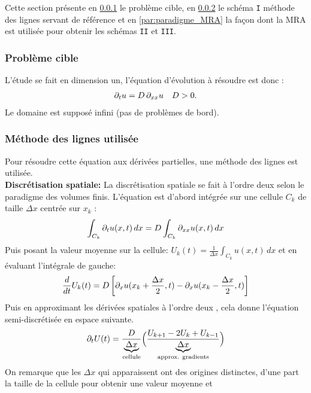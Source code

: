 Cette section présente en \ref{par:contrib2_target} le problème cible, en \ref{par:contrib2_MoL} le schéma \texttt{I} méthode des lignes servant de référence et en \ref{par:paradigme_MRA} la façon dont la MRA est utilisée pour obtenir les schémas \texttt{II} et \texttt{III}.
\subsubsection{Problème cible}\label{par:contrib2_target}

    L'étude se fait en dimension un, l'équation d'évolution à résoudre est donc :
    \begin{align}
        \partial_t u = D \,\partial_{xx} u \quad D >0.
    \end{align}
    Le domaine est supposé infini (pas de problèmes de bord).
        \subsubsection{Méthode des lignes utilisée}\label{par:contrib2_MoL}
            Pour résoudre cette équation aux dérivées partielles, une méthode des lignes est utilisée.\\
            \textbf{Discrétisation spatiale: }
            La discrétisation spatiale se fait à l'ordre deux selon le paradigme des volumes finis.
            L'équation est d'abord intégrée sur une cellule $C_k$ de taille $\Delta x$ centrée sur $x_k$ : 
            \begin{align}
                \int_{C_k} \partial_t u(x,t) \, dx = D \int_{C_k} \partial_{xx} u(x,t) \, dx 
            \end{align}
            Puis posant la valeur moyenne sur la cellule: $U_k(t) = \frac{1}{\Delta x} \int_{C_k} u(x,t) \, dx$ et en évaluant l'intégrale de gauche:  
            \begin{align}
                \frac{d}{dt} U_k(t) = D \left[ \partial_x u(x_k + \frac{\Delta x}{2},t) - \partial_x u(x_k - \frac{\Delta x}{2},t)\right]
            \end{align}
            Puis en approximant les dérivées spatiales à l'ordre deux , cela donne l'équation semi-discrétisée en espace suivante.
            \begin{align}
                \partial_t U(t) = \frac{D}{\underbrace{\Delta x}_{\text{cellule}}} \Bigl(\frac{U_{k+1} - 2 U_{k} + U_{k-1}}{\underbrace{\Delta x}_{\text{approx. gradients}}}\Bigr)
            \end{align}
            On remarque que les $\Delta x$ qui apparaissent ont des origines distinctes, d'une part la taille de la cellule pour obtenir une valeur moyenne et 
